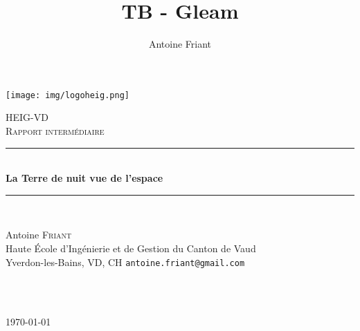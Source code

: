 \documentclass[a4paper]{report}
\title{TB - Gleam}
\author{Antoine Friant}
\begin{document}
\begin{titlepage}

\newcommand{\HRule}{\rule{\linewidth}{0.5mm}} %

\texttt{[image: img/logoheig.png]}\\ %

\vspace{1in}

\center %
 

\textsc{\LARGE HEIG-VD}\\[1.5cm] %
\textsc{\Large Rapport intermédiaire}\\[0.5cm] %


\HRule \\[0.4cm]
{ \huge \bfseries La Terre de nuit vue de l'espace }\\ %
\Large\HRule \\[2cm]
\normalsize

\begin{minipage}[t]{0.48\textwidth}
\begin{flushleft} \large
Antoine \textsc{Friant} \\
\normalsize
Haute École d'Ingénierie et de Gestion du Canton de Vaud\\
Yverdon-les-Bains, VD, CH
\texttt{antoine.friant@gmail.com}
\end{flushleft}
\end{minipage}
~
\begin{minipage}[t]{0.49\textwidth}
\begin{flushright} \large
\end{flushright}
\end{minipage}\\[2cm]



{\large \today}\\
 

\vfill %

\end{titlepage}
\end{document}
